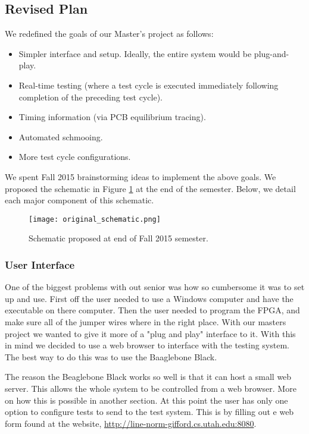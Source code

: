 \subsection{Revised Plan}
We redefined the goals of our Master's project as follows: 
\begin{itemize}
\item Simpler interface and setup. Ideally, the entire system would be plug-and-play.
\item Real-time testing (where a test cycle is executed immediately following completion of the preceding test cycle).
\item Timing information (via PCB equilibrium tracing).
\item Automated schmooing.
\item More test cycle configurations.
\end{itemize}

We spent Fall 2015 brainstorming ideas to implement the above goals. We proposed the schematic in Figure \ref{fig:f15_schematic} at the end of the semester. Below, we detail each major component of this schematic.

\begin{figure}
\texttt{[image: original\_schematic.png]}
\caption{Schematic proposed at end of Fall 2015 semester.}
\label{fig:f15_schematic}
\end{figure}

\subsubsection{User Interface}
One of the biggest problems with out senior was how so cumbersome  it was to set up and use. First off the user needed to use a Windows computer and have the executable on there computer. Then the user needed to program the FPGA, and make sure all of the jumper wires where in the right place. With our masters project we wanted to give it more of a "plug and play" interface to it. With this in mind we decided to use a web browser to interface with the testing system. The best way to do this was to use the Baaglebone Black.

The reason the Beaglebone Black works so well is that it can host a small web server. This allows the whole system to be controlled from a web browser. More on how this is possible in another section. At this point the user has only one option to configure tests to send to the test system. This is by filling out e web form found at the website, \url{http://line-norm-gifford.cs.utah.edu:8080}. 

